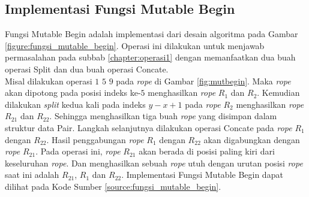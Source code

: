 \subsection{Implementasi Fungsi Mutable Begin}
Fungsi Mutable Begin adalah implementasi dari desain algoritma pada Gambar \ref{figure:fungsi_mutable_begin}. Operasi ini dilakukan untuk menjawab permasalahan pada subbab \ref{chapter:operasi1} dengan memanfaatkan dua buah operasi Split dan dua buah operasi Concate.\\
Misal dilakukan operasi $1$ $5$ $9$ pada \textit{rope} di Gambar \ref{fig:mutbegin}. Maka \textit{rope} akan dipotong pada posisi indeks ke-$5$ menghasilkan \textit{rope} $R_1$ dan $R_2$. Kemudian dilakukan \textit{split} kedua kali pada indeks $y-x+1$ pada \textit{rope} $R_2$ menghasilkan \textit{rope} $R_{21}$ dan $R_{22}$. Sehingga menghasilkan tiga buah \textit{rope} yang disimpan dalam struktur data Pair. Langkah selanjutnya dilakukan operasi Concate pada \textit{rope} $R_1$ dengan $R_{22}$. Hasil penggabungan \textit{rope} $R_1$ dengan $R_{22}$ akan digabungkan dengan \textit{rope} $R_{21}$. Pada operasi ini, \textit{rope} $R_{21}$ akan berada di posisi paling kiri dari keseluruhan \textit{rope}. Dan menghasilkan sebuah \textit{rope} utuh dengan urutan posisi \textit{rope} saat ini adalah $R_{21}$, $R_1$ dan $R_{22}$. Implementasi Fungsi Mutable Begin dapat dilihat pada Kode Sumber \ref{source:fungsi_mutable_begin}.
